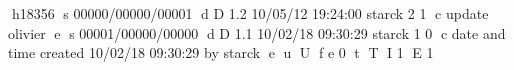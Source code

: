 h18356
s 00000/00000/00001
d D 1.2 10/05/12 19:24:00 starck 2 1
c update olivier
e
s 00001/00000/00000
d D 1.1 10/02/18 09:30:29 starck 1 0
c date and time created 10/02/18 09:30:29 by starck
e
u
U
f e 0
t
T
I 1
E 1
